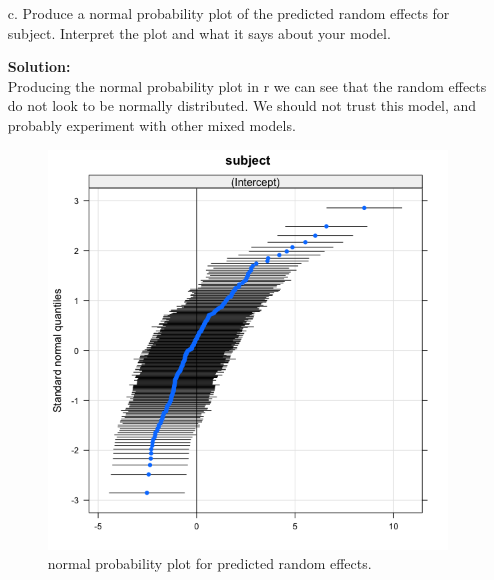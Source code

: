 \documentclass[12pt]{article}
\makeatletter
\theoremstyle{homework}
\newenvironment{exercise}[1]
{\def\@currentlabel{#1}\exercisecore}
{\endexercisecore}
\newcommand{\localhead}[1]{\par\smallskip\noindent\textbf{#1}\nobreak\\}%
\newcommand\solution{\localhead{Solution:}}
\makeatother
\begin{document}
\begin{exercise}{3.}
\begin{enumerate}
    \item[c.] Produce a normal probability plot of the predicted random effects for subject. Interpret the plot and what it says about your model.\\
    \solution  Producing the normal probability plot in r we can see that the random effects do not look to be normally distributed. We should not trust this model, and probably experiment with 
    other mixed models. 
    \begin{figure}[H] 
      \begin{center} 
      \caption{normal probability plot for predicted random effects.} 
      \includegraphics[width = \textwidth]{Rplot05.png} 
    \end{center} 
  \end{figure}
  \end{enumerate}
  
\end{exercise}
\end{document}
